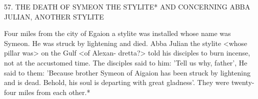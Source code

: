 57. THE DEATH OF SYMEON THE STYLITE* AND
CONCERNING ABBA JULIAN, ANOTHER STYLITE

Four miles from the city of Egaion a stylite was installed whose
name was Symeon. He was struck by lightening and died. Abba
Julian the stylite <whose pillar was> on the Gulf <of Alexan-
dretta?> told his disciples to burn incense, not at the accustomed
time. The disciples said to him: 'Tell us why, father', He said to
them: 'Because brother Symeon of Aigaion has been struck by
lightening and is dead. Behold, his soul is departing with great
gladness'. They were twenty-four miles from each other.*

